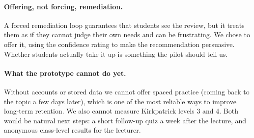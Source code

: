 \documentclass[11pt,a4paper]{article}
\begin{document}
\paragraph{Offering, not forcing, remediation.} A forced remediation loop guarantees that students
see the review, but it treats them as if they cannot judge their own needs and can be frustrating.
We chose to offer it, using the confidence rating to make the recommendation persuasive. Whether
students actually take it up is something the pilot should tell us.

\paragraph{What the prototype cannot do yet.} Without accounts or stored data we cannot offer
spaced practice (coming back to the topic a few days later), which is one of the most reliable
ways to improve long-term retention. We also cannot measure Kirkpatrick levels 3 and 4. Both would
be natural next steps: a short follow-up quiz a week after the lecture, and anonymous class-level
results for the lecturer.
\end{document}
